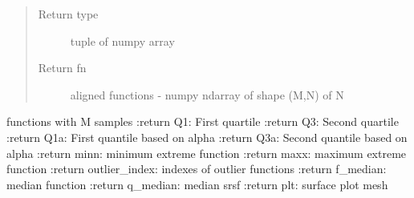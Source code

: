 \documentclass[letterpaper,10pt,english]{sphinxmanual}
\begin{document}
\begin{fulllineitems}
\begin{quote}
\begin{description}
\begin{itemize}
\end{itemize}

\item[{Return type}] \leavevmode
tuple of numpy array

\item[{Return fn}] \leavevmode
aligned functions - numpy ndarray of shape (M,N) of N

\end{description}\end{quote}

functions with M samples
:return Q1: First quartile
:return Q3: Second quartile
:return Q1a: First quantile based on alpha
:return Q3a: Second quantile based on alpha
:return minn: minimum extreme function
:return maxx: maximum extreme function
:return outlier\_index: indexes of outlier functions
:return f\_median: median function
:return q\_median: median srsf
:return plt: surface plot mesh

\end{fulllineitems}

\end{document}
